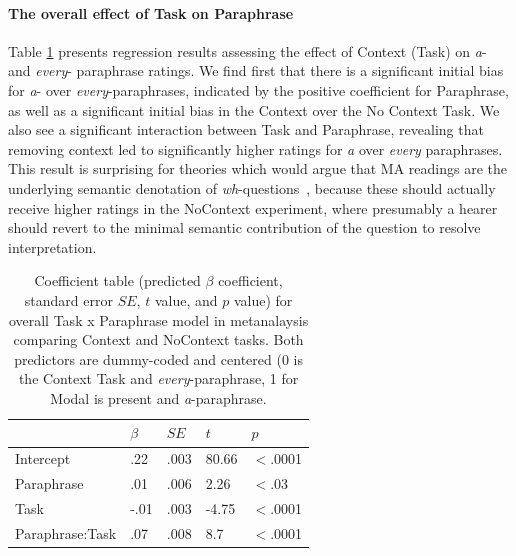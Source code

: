 \documentclass[12pt,letterpaper,table,svgnames,dvipsnames]{article}
\newcommand{\whqs}{\emph{wh}-questions~}
\begin{document}
\paragraph{The overall effect of Task on Paraphrase}

Table \ref{sub-model_Task} presents regression results assessing the effect of Context (Task) on \emph{a}- and \emph{every}- paraphrase ratings. We find first that there is a significant initial bias for \emph{a}- over \emph{every}-paraphrases, indicated by the positive coefficient for Paraphrase, as well as a significant initial bias in the Context over the No Context Task. We also see a significant interaction between Task and Paraphrase, revealing that removing context led to significantly higher ratings for \emph{a} over \emph{every} paraphrases. This result is surprising for theories which would argue that MA readings are the underlying semantic denotation of \whqs, because these should actually receive higher ratings in the NoContext experiment, where presumably a hearer should revert to the minimal semantic contribution of the question to resolve interpretation.

\begin{table}
\begin{center} 
\caption{Coefficient table (predicted $\beta$ coefficient, standard error $SE$, $t$ value, and $p$ value) for overall Task x Paraphrase model in metanalaysis comparing Context and NoContext tasks. Both predictors are dummy-coded and centered (0 is the Context Task and \emph{every}-paraphrase, 1 for Modal is present and \emph{a}-paraphrase.} 
\label{sub-model_Task} 
\begin{tabular}{lllll} 
\toprule
{} & $\beta$ & $SE$ & $t$ & $p$\\
\midrule
Intercept & .22 & .003 & 80.66 & $<$.0001\\
Paraphrase & .01 & .006 & 2.26 & $<$.03\\
Task & -.01 & .003 & -4.75 & $<$.0001\\
Paraphrase:Task & .07 & .008 & 8.7 & $<$.0001\\
\bottomrule
\end{tabular} 
\end{center} 
\end{table}

\end{document}
